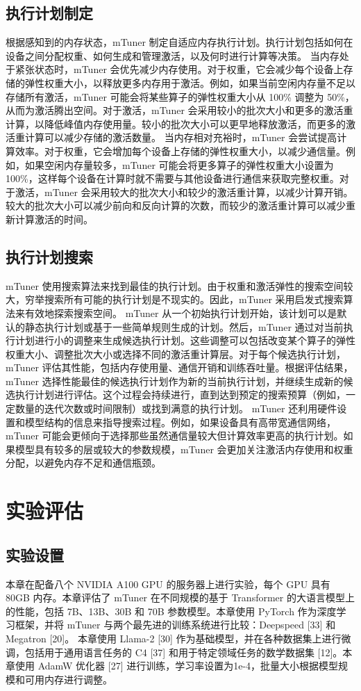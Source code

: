 \subsection{执行计划制定}
根据感知到的内存状态，mTuner 制定自适应内存执行计划。执行计划包括如何在设备之间分配权重、如何生成和管理激活，以及何时进行计算等决策。
当内存处于紧张状态时，mTuner 会优先减少内存使用。对于权重，它会减少每个设备上存储的弹性权重大小，以释放更多内存用于激活。例如，如果当前空闲内存量不足以存储所有激活，mTuner 可能会将某些算子的弹性权重大小从 100\% 调整为 50\%，从而为激活腾出空间。对于激活，mTuner 会采用较小的批次大小和更多的激活重计算，以降低峰值内存使用量。较小的批次大小可以更早地释放激活，而更多的激活重计算可以减少存储的激活数量。
当内存相对充裕时，mTuner 会尝试提高计算效率。对于权重，它会增加每个设备上存储的弹性权重大小，以减少通信量。例如，如果空闲内存量较多，mTuner 可能会将更多算子的弹性权重大小设置为 100\%，这样每个设备在计算时就不需要与其他设备进行通信来获取完整权重。对于激活，mTuner 会采用较大的批次大小和较少的激活重计算，以减少计算开销。较大的批次大小可以减少前向和反向计算的次数，而较少的激活重计算可以减少重新计算激活的时间。
\subsection{执行计划搜索}
mTuner 使用搜索算法来找到最佳的执行计划。由于权重和激活弹性的搜索空间较大，穷举搜索所有可能的执行计划是不现实的。因此，mTuner 采用启发式搜索算法来有效地探索搜索空间。
mTuner 从一个初始执行计划开始，该计划可以是默认的静态执行计划或基于一些简单规则生成的计划。然后，mTuner 通过对当前执行计划进行小的调整来生成候选执行计划。这些调整可以包括改变某个算子的弹性权重大小、调整批次大小或选择不同的激活重计算层。对于每个候选执行计划，mTuner 评估其性能，包括内存使用量、通信开销和训练吞吐量。根据评估结果，mTuner 选择性能最佳的候选执行计划作为新的当前执行计划，并继续生成新的候选执行计划进行评估。这个过程会持续进行，直到达到预定的搜索预算（例如，一定数量的迭代次数或时间限制）或找到满意的执行计划。
mTuner 还利用硬件设置和模型结构的信息来指导搜索过程。例如，如果设备具有高带宽通信网络，mTuner 可能会更倾向于选择那些虽然通信量较大但计算效率更高的执行计划。如果模型具有较多的层或较大的参数规模，mTuner 会更加关注激活内存使用和权重分配，以避免内存不足和通信瓶颈。


\section{实验评估}
\subsection{实验设置}
本章在配备八个 NVIDIA A100 GPU 的服务器上进行实验，每个 GPU 具有 80GB 内存。本章评估了 mTuner 在不同规模的基于 Transformer 的大语言模型上的性能，包括 7B、13B、30B 和 70B 参数模型。本章使用 PyTorch 作为深度学习框架，并将 mTuner 与两个最先进的训练系统进行比较：Deepspeed [33] 和 Megatron [20]。
本章使用 Llama-2 [30] 作为基础模型，并在各种数据集上进行微调，包括用于通用语言任务的 C4 [37] 和用于特定领域任务的数学数据集 [12]。本章使用 AdamW 优化器 [27] 进行训练，学习率设置为1e-4，批量大小根据模型规模和可用内存进行调整。

